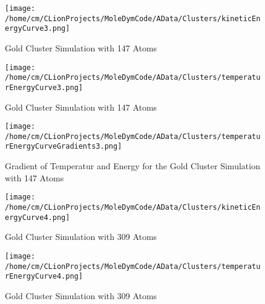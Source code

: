 \begin{figure}[!h] 
    \begin{center} 
        \texttt{[image: /home/cm/CLionProjects/MoleDymCode/AData/Clusters/kineticEnergyCurve3.png]} 
    \end{center} 
    \caption[Gold Cluster Simulation with 147 Atoms]{Gold Cluster Simulation with 147 Atoms} 
    \label{GoldClusterSimulationKineticTime147} 
\end{figure} 
 
\begin{figure}[!h] 
    \begin{center} 
        \texttt{[image: /home/cm/CLionProjects/MoleDymCode/AData/Clusters/temperaturEnergyCurve3.png]} 
    \end{center} 
    \caption[Gold Cluster Simulation with 147 Atoms]{Gold Cluster Simulation with 147 Atoms} 
    \label{GoldClusterSimulationTemperaturEnergy147} 
\end{figure} 
 
\begin{figure}[!h] 
    \begin{center} 
        \texttt{[image: /home/cm/CLionProjects/MoleDymCode/AData/Clusters/temperaturEnergyCurveGradients3.png]} 
    \end{center} 
    \caption[Gradient of Temperatur and Energy for the Gold Cluster Simulation with 147 Atoms]{Gradient of Temperatur and Energy for the Gold Cluster Simulation with 147 Atoms} 
    \label{GoldClusterSimulationGradient147} 
\end{figure} 
 
\begin{figure}[!h] 
    \begin{center} 
        \texttt{[image: /home/cm/CLionProjects/MoleDymCode/AData/Clusters/kineticEnergyCurve4.png]} 
    \end{center} 
    \caption[Gold Cluster Simulation with 309 Atoms]{Gold Cluster Simulation with 309 Atoms} 
    \label{GoldClusterSimulationKineticTime309} 
\end{figure} 
 
\begin{figure}[!h] 
    \begin{center} 
        \texttt{[image: /home/cm/CLionProjects/MoleDymCode/AData/Clusters/temperaturEnergyCurve4.png]} 
    \end{center} 
    \caption[Gold Cluster Simulation with 309 Atoms]{Gold Cluster Simulation with 309 Atoms} 
    \label{GoldClusterSimulationTemperaturEnergy309} 
\end{figure} 
 
